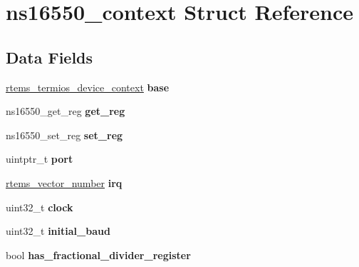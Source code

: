 \hypertarget{structns16550__context}{}\section{ns16550\+\_\+context Struct Reference}
\label{structns16550__context}
\subsection*{Data Fields}
\begin{DoxyCompactItemize}
\item 
\mbox{\label{structns16550__context_a9a31e6b524ef366a859257fccf4be8f5}} 
\mbox{\hyperlink{structrtems__termios__device__context}{rtems\+\_\+termios\+\_\+device\+\_\+context}} {\bfseries base}
\item 
\mbox{\label{structns16550__context_a6460327533c8d9bb0051509f4b8baca4}} 
ns16550\+\_\+get\+\_\+reg {\bfseries get\+\_\+reg}
\item 
\mbox{\label{structns16550__context_a9edae7e8af99ad44aa90622b850f4b3a}} 
ns16550\+\_\+set\+\_\+reg {\bfseries set\+\_\+reg}
\item 
\mbox{\label{structns16550__context_a06d18dee987565cf12eb3325ddbafc6d}} 
uintptr\+\_\+t {\bfseries port}
\item 
\mbox{\label{structns16550__context_ac8cfd1b007b09d703e63f8af551ea899}} 
\mbox{\hyperlink{group__ClassicINTR_ga3e434c197d99f128e78cae4d9358bd8b}{rtems\+\_\+vector\+\_\+number}} {\bfseries irq}
\item 
\mbox{\label{structns16550__context_a3ce9ab37a3edb79c526f7129c668191c}} 
uint32\+\_\+t {\bfseries clock}
\item 
\mbox{\label{structns16550__context_ac2b562215d617501f65ee71265a1edc8}} 
uint32\+\_\+t {\bfseries initial\+\_\+baud}
\item 
\mbox{\label{structns16550__context_af5551b745c4a0c33c31eb43145d0ba8a}} 
bool {\bfseries has\+\_\+fractional\+\_\+divider\+\_\+register}

\end{DoxyCompactItemize}
